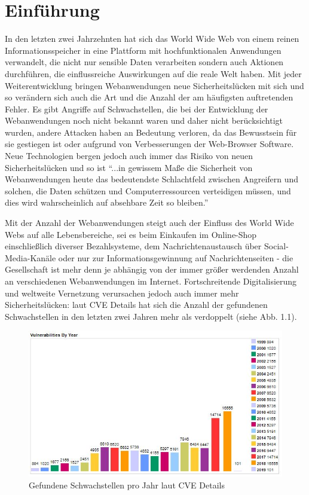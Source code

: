 \documentclass[12pt,oneside,a4paper,parskip]{scrbook}
\begin{document}
\mainmatter

\chapter{Einführung}\label{ch:intro}
In den letzten zwei Jahrzehnten hat sich das World Wide Web von einem reinen Informationsspeicher in eine Plattform mit hochfunktionalen Anwendungen verwandelt, die nicht nur sensible Daten verarbeiten sondern auch  Aktionen durchführen, die einflussreiche Auswirkungen auf die reale Welt haben.
Mit jeder Weiterentwicklung bringen Webanwendungen neue Sicherheitslücken mit sich und so verändern sich auch die Art und die Anzahl der am häufigsten auftretenden Fehler. Es gibt Angriffe auf Schwachstellen, die bei der Entwicklung der Webanwendungen noch nicht bekannt waren und daher nicht berücksichtigt wurden, andere Attacken haben an Bedeutung verloren, da das Bewusstsein für sie gestiegen ist oder aufgrund von Verbesserungen der Web-Browser Software. Neue Technologien bergen jedoch auch immer das Risiko von neuen Sicherheitslücken und so ist ``...in gewissem Maße die Sicherheit von Webanwendungen heute das bedeutendste Schlachtfeld zwischen Angreifern und solchen, die Daten schützen und Computerressourcen verteidigen müssen, und dies wird wahrscheinlich auf absehbare Zeit so bleiben.'' \cite{handbook}

Mit der Anzahl der Webanwendungen steigt auch der Einfluss des World Wide Webs auf alle Lebensbereiche, sei es beim Einkaufen im Online-Shop einschließlich diverser Bezahlsysteme, dem Nachrichtenaustausch über Social-Media-Kanäle oder nur zur Informationsgewinnung auf Nachrichtenseiten - die Gesellschaft ist mehr denn je abhängig von der immer größer werdenden Anzahl an verschiedenen Webanwendungen im Internet.
Fortschreitende Digitalisierung und weltweite Vernetzung verursachen jedoch auch immer mehr Sicherheitslücken: laut CVE Details hat sich die Anzahl der gefundenen Schwachstellen in den letzten zwei Jahren mehr als verdoppelt (siehe Abb. 1.1).

\begin{figure}[htb!]
  \centering
    \includegraphics[width=1\textwidth]{Images/VulnByYear}
  \caption[Gefundene Schwachstellen pro Jahr laut CVE Details]{Gefundene Schwachstellen pro Jahr laut CVE Details \cite{cve}}
  \end{figure}
\end{document}

